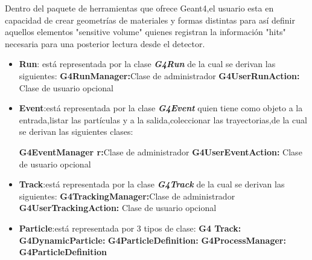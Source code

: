\documentclass[12pt,fleqn]{book} %
\numberwithin{equation}{section} %
\numberwithin{figure}{section} %
\numberwithin{table}{section} %
\begin{document}
{Dentro del paquete de herramientas que ofrece Geant4,el usuario esta en capacidad de crear geometrías de materiales  y formas distintas para así definir aquellos elementos "sensitive volume" quienes registran la información "hits" necesaria para una posterior lectura desde el detector.


\begin{itemize}
\item \textbf{Run}: está representada por la clase \textbf{\textit{G4Run}} de la cual se derivan las siguientes:
\subitem \textbf{G4RunManager:}Clase de administrador
\subitem \textbf{G4UserRunAction:} Clase de usuario opcional
\end{itemize}


\begin{itemize}
 \item \textbf {Event}:está representada por la clase \textbf{\textit{G4Event}}  quien tiene como objeto  a la entrada,listar las partículas y a la salida,coleccionar las trayectorias,de la cual se derivan las siguientes clases:
 
 \subitem \textbf{G4EventManager r:}Clase de administrador
\subitem \textbf{G4UserEventAction:} Clase de usuario opcional
\end{itemize}


\begin{itemize}
 \item \textbf {Track}:está representada por la clase \textbf{\textit{G4Track}} de la cual se derivan las siguientes:
 \subitem \textbf{G4TrackingManager:}Clase de administrador
\subitem \textbf{G4UserTrackingAction:} Clase de usuario opcional
\end{itemize}


\begin{itemize}
 \item \textbf {Particle}:está representada por $3$ tipos de clase: \subitem\textbf{G4 Track:} 
\subitem \textbf{G4DynamicParticle:}
\subitem \textbf{G4ParticleDefinition:}
\subitem
\textbf{G4ProcessManager:}
\textbf{G4ParticleDefinition}
\end{itemize}



}
\end{document}
